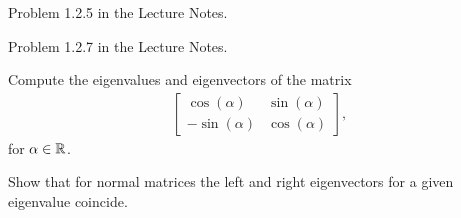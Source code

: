 
\begin{Sheet}
  \label{sheet2}
		
  \begin{Problem}
  	Problem 1.2.5 in the Lecture Notes.
  \end{Problem}

  \begin{Problem}
	Problem 1.2.7 in the Lecture Notes.
  \end{Problem}

  \begin{Problem}
	Compute the eigenvalues and eigenvectors of the matrix
	\begin{gather*}
	\begin{bmatrix}
	\cos(\alpha) & \sin(\alpha) \\
	-\sin(\alpha) & \cos(\alpha)
	\end{bmatrix},
	\end{gather*}
	for $\alpha\in\mathbb R$.
  \end{Problem}

  \begin{Problem}
  	Show that for normal matrices the left and right eigenvectors for
  	a given eigenvalue coincide.
  \end{Problem}

\end{Sheet}

